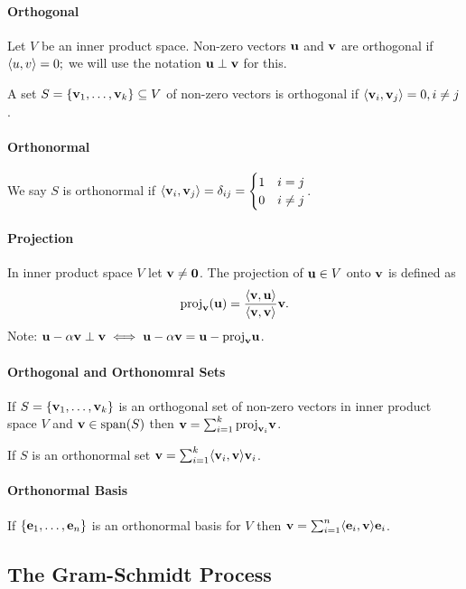 \paragraph{Orthogonal}
Let \(V\) be an inner product space. Non-zero vectors \(\mathbf{u}\) and \(\mathbf{v}\) are orthogonal if \(\langle u, v \rangle = 0;\) we will use the notation \(\mathbf{u} \perp \mathbf{v}\) for this.

A set \(S = \{\mathbf{v}_1, \dots, \mathbf{v}_k\} \subseteq V\) of non-zero vectors is orthogonal if \(\langle \mathbf{v}_i, \mathbf{v}_j \rangle = 0, i \neq j\).

\paragraph{Orthonormal}
We say \(S\) is orthonormal if \(\langle \mathbf{v}_i, \mathbf{v}_j \rangle = \delta_{ij} = \begin{cases}
    1 & i = j \\
    0 & i \neq j
\end{cases}\).

\paragraph{Projection}
In inner product space \(V\) let \(\mathbf{v} \neq \mathbf{0}\). The projection of \(\mathbf{u} \in V\) onto \(\mathbf{v}\) is defined as
\[\mathrm{proj}_{\mathbf{v}}(\mathbf{u}) = \frac{\langle \mathbf{v}, \mathbf{u} \rangle}{\langle \mathbf{v}, \mathbf{v} \rangle}\mathbf{v}.\]
Note: \(\mathbf{u} - \alpha\mathbf{v} \perp \mathbf{v} \iff \mathbf{u} - \alpha\mathbf{v} = \mathbf{u} - \mathrm{proj}_{\mathbf{v}}\mathbf{u}\).

\paragraph{Orthogonal and Orthonomral Sets}
If \(S = \{\mathbf{v}_1, \dots, \mathbf{v}_k\}\) is an orthogonal set of non-zero vectors in inner product space \(V\) and \(\mathbf{v} \in \mathrm{span}(S)\) then \(\mathbf{v} = \sum_{i=1}^k \mathrm{proj}_{\mathbf{v}_i}\mathbf{v}\).

If \(S\) is an orthonormal set \(\mathbf{v} = \sum_{i=1}^k \langle \mathbf{v}_i, \mathbf{v} \rangle\mathbf{v}_i\).

\paragraph{Orthonormal Basis}
If \(\{\mathbf{e}_1, \dots, \mathbf{e}_n\}\) is an orthonormal basis for \(V\) then \(\mathbf{v} = \sum_{i=1}^n \langle \mathbf{e}_i, \mathbf{v} \rangle\mathbf{e}_i\).

\subsection{The Gram-Schmidt Process}
